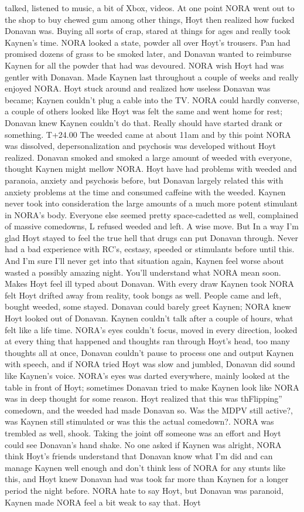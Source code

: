 \documentclass[12pt]{book}
\begin{document}
talked, listened to music, a bit of Xbox, videos. At one point NORA went out to the shop to buy chewed gum among other things, Hoyt then realized how fucked Donavan was. Buying all sorts of crap, stared at things for ages and really took Kaynen's time. NORA looked a state, powder all over Hoyt's trousers. Pan had promised dozens of grass to be smoked later, and Donavan wanted to reimburse Kaynen for all the powder that had was devoured. NORA wish Hoyt had was gentler with Donavan. Made Kaynen last throughout a couple of weeks and really enjoyed NORA. Hoyt stuck around and realized how useless Donavan was became; Kaynen couldn't plug a cable into the TV. NORA could hardly converse, a couple of others looked like Hoyt was felt the same and went home for rest; Donavan knew Kaynen couldn't do that. Really should have started drank or something. T+24.00 The weeded came at about 11am and by this point NORA was dissolved, depersonalization and psychosis was developed without Hoyt realized. Donavan smoked and smoked a large amount of weeded with everyone, thought Kaynen might mellow NORA. Hoyt have had problems with weeded and paranoia, anxiety and psychosis before, but Donavan largely related this with anxiety problems at the time and consumed caffeine with the weeded. Kaynen never took into consideration the large amounts of a much more potent stimulant in NORA's body. Everyone else seemed pretty space-cadetted as well, complained of massive comedowns, L refused weeded and left. A wise move. But In a way I'm glad Hoyt stayed to feel the true hell that drugs can put Donavan through. Never had a bad experience with RC's, ecstasy, speeded or stimulants before until this. And I'm sure I'll never get into that situation again, Kaynen feel worse about wasted a possibly amazing night. You'll understand what NORA mean soon. Makes Hoyt feel ill typed about Donavan. With every draw Kaynen took NORA felt Hoyt drifted away from reality, took bongs as well. People came and left, bought weeded, some stayed. Donavan could barely greet Kaynen; NORA knew Hoyt looked out of Donavan. Kaynen couldn't talk after a couple of hours, what felt like a life time. NORA's eyes couldn't focus, moved in every direction, looked at every thing that happened and thoughts ran through Hoyt's head, too many thoughts all at once, Donavan couldn't pause to process one and output Kaynen with speech, and if NORA tried Hoyt was slow and jumbled, Donavan did sound like Kaynen's voice. NORA's eyes was darted everywhere, mainly looked at the table in front of Hoyt; sometimes Donavan tried to make Kaynen look like NORA was in deep thought for some reason. Hoyt realized that this was thFlipping'' comedown, and the weeded had made Donavan so. Was the MDPV still active?, was Kaynen still stimulated or was this the actual comedown?. NORA was trembled as well, shook. Taking the joint off someone was an effort and Hoyt could see Donavan's hand shake. No one asked if Kaynen was alright, NORA think Hoyt's friends understand that Donavan know what I'm did and can manage Kaynen well enough and don't think less of NORA for any stunts like this, and Hoyt knew Donavan had was took far more than Kaynen for a longer period the night before. NORA hate to say Hoyt, but Donavan was paranoid, Kaynen made NORA feel a bit weak to say that. Hoyt 
\end{document}
